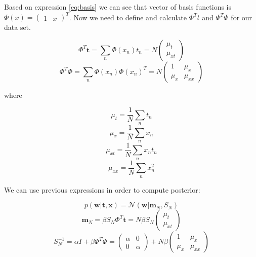 \documentclass{article}
\begin{document}
Based on expression \ref{eq:basis} we can see that vector of basis functions is $\Phi(x) = \begin{pmatrix} 1 & x \end{pmatrix}^T$. Now we need to define and calculate $\Phi^Tt$ and $\Phi^T\Phi$ for our data set.

\begin{equation}
    \Phi^T\textbf{t} = \sum_n\Phi(x_n)t_n = N
    \begin{pmatrix}
        \mu_t \\
        \mu_{xt}
    \end{pmatrix}
\end{equation}
\begin{equation}
    \Phi^T\Phi = \sum_n\Phi(x_n)\Phi(x_n)^T = N
    \begin{pmatrix}
        1 & \mu_x \\
        \mu_x & \mu_{xx}
    \end{pmatrix}
\end{equation}

where

\begin{equation}
    \mu_t = \frac{1}{N} \sum_n t_n
\end{equation}
\begin{equation}
    \mu_x = \frac{1}{N} \sum_n x_n
\end{equation}
\begin{equation}
    \mu_{xt} = \frac{1}{N} \sum_n x_n t_n
\end{equation}
\begin{equation}
    \mu_{xx} = \frac{1}{N} \sum_n x_n^2
\end{equation}

We can use previous expressions in order to compute posterior:

\begin{equation}
    p(\textbf{w}|\textbf{t},\textbf{x}) = \mathcal{N}(\textbf{w}|\textbf{m}_N, S_N)
\end{equation}
\begin{equation}
    \textbf{m}_N = \beta S_N \Phi^T\textbf{t} = N \beta S_N 
    \begin{pmatrix}
        \mu_t \\
        \mu_{xt}
    \end{pmatrix}
\end{equation}
\begin{equation}
    S_N^{-1} = \alpha I + \beta \Phi^T\Phi = 
    \begin{pmatrix}
        \alpha & 0 \\
        0 & \alpha
    \end{pmatrix}
    + N \beta 
    \begin{pmatrix}
        1 & \mu_x \\
        \mu_x & \mu_{xx}
    \end{pmatrix}
\end{equation}
\end{document}
